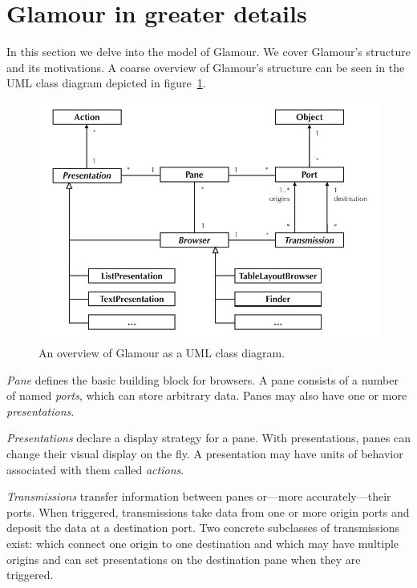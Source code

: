 \documentclass[a4paper,10pt,twoside]{book}
\begin{document}
\section{Glamour in greater details}

In this section we delve into the model of Glamour. We cover Glamour's
structure and its motivations. A coarse overview of Glamour's
structure can be seen in the UML class diagram depicted in
figure~\ref{fig:uml-overview}.

\begin{figure}[htbp]
\centerline{\includegraphics[width=\linewidth]{class_diagram.pdf}}
\caption{An overview of Glamour as a UML class diagram.}
\label{fig:uml-overview}
\end{figure}

\emph{Pane} defines the basic building block for browsers. A pane
consists of a number of named \emph{ports}, which can store arbitrary
data. Panes may also have one or more \emph{presentations}.

\emph{Presentations} declare a display strategy for a pane. With
presentations, panes can change their visual display on the fly. A
presentation may have units of behavior associated with them called
\emph{actions}.

\emph{Transmissions} transfer information between panes or---more accurately---their ports. When triggered, transmissions take data from one or more origin ports and deposit the data at a destination port. Two concrete subclasses of transmissions exist:  which connect one origin to one destination and  which may have multiple origins and can set presentations on the destination pane when they are triggered.
\end{document}
